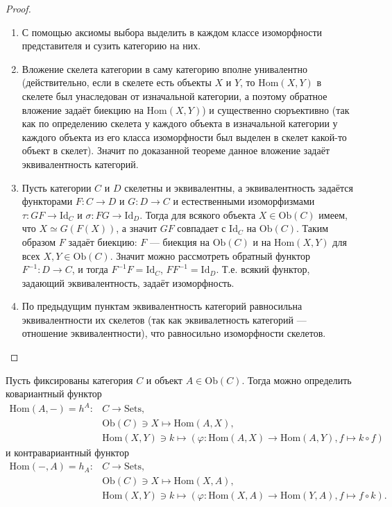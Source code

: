 \documentclass[12pt,a4paper]{article}
\newcommand{\Id}{\mathrm{Id}}
\newcommand{\Hom}{\mathrm{Hom}}
\newcommand{\Ob}{\mathrm{Ob}}
\newcommand{\Sets}{\mathrm{Sets}}
\begin{document}
    \begin{proof}
        \begin{enumerate}
            \item С помощью аксиомы выбора выделить в каждом классе изоморфности представителя и сузить категорию на них.
            \item Вложение скелета категории в саму категорию вполне унивалентно (действительно, если в скелете есть объекты $X$ и $Y$, то $\Hom(X, Y)$ в скелете был унаследован от изначальной категории, а поэтому обратное вложение задаёт биекцию на $\Hom(X, Y)$) и существенно сюръективно (так как по определению скелета у каждого объекта в изначальной категории у каждого объекта из его класса изоморфности был выделен в скелет какой-то объект в скелет). Значит по доказанной теореме данное вложение задаёт эквивалентность категорий.
            \item Пусть категории $C$ и $D$ скелетны и эквивалентны, а эквивалентность задаётся функторами $F: C \to D$ и $G: D \to C$ и естественными изоморфизмами $\tau: GF \to \Id_C$ и $\sigma: FG \to \Id_D$. Тогда для всякого объекта $X \in \Ob(C)$ имеем, что $X \simeq G(F(X))$, а значит $GF$ совпадает с $\Id_C$ на $\Ob(C)$. Таким образом $F$ задаёт биекцию: $F$ --- биекция на $\Ob(C)$ и на $\Hom(X, Y)$ для всех $X, Y \in \Ob(C)$. Значит можно рассмотреть обратный функтор $F^{-1}: D \to C$, и тогда $F^{-1}F = \Id_C$, $F F^{-1} = \Id_D$. Т.е. всякий функтор, задающий эквивалентность, задаёт изоморфность.
            \item По предыдущим пунктам эквивалентность категорий равносильна эквивалентности их скелетов (так как эквивалетность категорий --- отношение эквивалентности), что равносильно изоморфности скелетов.
        \end{enumerate}
    \end{proof}

    \begin{definition}
        Пусть фиксированы категория $C$ и объект $A \in \Ob(C)$. Тогда можно определить ковариантный функтор
        \begin{align*}
            \Hom(A, {-}) = h^A: {}
            &C \to \Sets,\\
            &\Ob(C) \ni X \mapsto \Hom(A, X),\\
            &\Hom(X, Y) \ni k \mapsto (\varphi: \Hom(A, X) \to \Hom(A, Y), f \mapsto k \circ f)
        \end{align*}
        и контравариантный функтор
        \begin{align*}
            \Hom({-}, A) = h_A: {}
            &C \to \Sets,\\
            &\Ob(C) \ni X \mapsto \Hom(X, A),\\
            &\Hom(X, Y) \ni k \mapsto (\varphi: \Hom(X, A) \to \Hom(Y, A), f \mapsto f \circ k).
        \end{align*}
    \end{definition}
\end{document}
